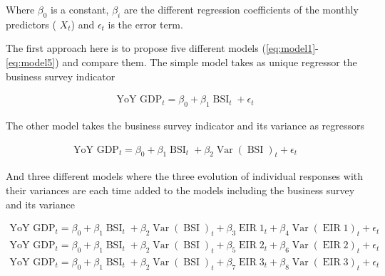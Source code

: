 \documentclass[12pt,a4paper,oneside]{book}
\DeclareMathOperator{\Var}{Var}
\DeclareMathOperator{\BSI}{BSI}
\DeclareMathOperator{\EIR}{EIR}
\begin{document}
Where $\beta_{0}$ is a constant, $\beta_{i}$  are the different regression coefficients of the monthly predictors ( $X_{t}$) and $\epsilon_t$ is the error term.

The first approach here is to propose five different models (\autoref{eq:model1}-\ref{eq:model5}) and compare them.
The simple model takes as unique regressor the business survey indicator

\begin{eqnarray}
    \text{YoY GDP}_{t} = \beta_0 + \beta_{1} \BSI_{t} + \epsilon_t \label{eq:model1} 
\end{eqnarray}

The other model takes the business survey indicator and its variance as regressors

\begin{eqnarray}
    \text{YoY GDP}_{t} = \beta_0 + \beta_{1} \BSI_{t}  + \beta_{2} \Var(\BSI)_{t} + \epsilon_t \label{eq:model2}
\end{eqnarray}

And three different models where the three evolution of individual responses with their variances are each time added to the models including the business survey and its variance

\begin{eqnarray}
    \text{YoY GDP}_{t} = \beta_0 + \beta_{1} \BSI_{t}  + \beta_{2} \Var(\BSI)_{t} + \beta_{3} \EIR1_{t}  + \beta_{4} \Var(\EIR1)_{t} + \epsilon_t \label{eq:model3}
\end{eqnarray}
\begin{eqnarray}
    \text{YoY GDP}_{t} = \beta_0 + \beta_{1} \BSI_{t}  + \beta_{2} \Var(\BSI)_{t} + \beta_{5} \EIR2_{t}  + \beta_{6} \Var(\EIR2)_{t} + \epsilon_t \label{eq:model4}
\end{eqnarray}
\begin{eqnarray}
    \text{YoY GDP}_{t} = \beta_0 + \beta_{1} \BSI_{t}  + \beta_{2} \Var(\BSI)_{t} + \beta_{7} \EIR3_{t}  + \beta_{8} \Var(\EIR3)_{t} + \epsilon_t  \label{eq:model5}
\end{eqnarray}
\end{document}
